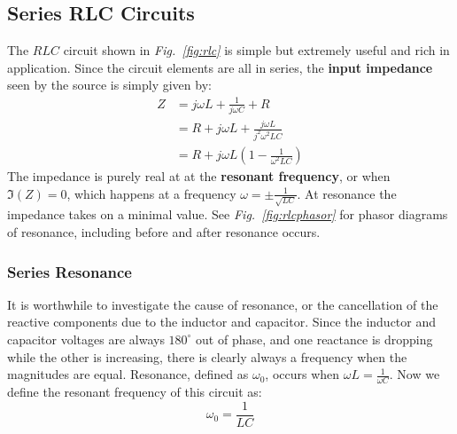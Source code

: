 \subsection{Series RLC Circuits} \label{sec:lcr}
The $RLC$ circuit shown in \emph{Fig.~\ref{fig:rlc}} is simple but extremely useful and rich in application.  Since the circuit elements are all in series, the \textbf{input impedance} seen by the source is simply given by:
    \begin{align*}
        Z &= j\omega L + \frac{1}{j\omega C} + R\\
        &= R + j\omega L + \frac{j\omega L}{j^2{\omega}^2 LC}\\
        &= R + j\omega L \left( 1 - \frac{1}{\omega^2 LC}\right)
    \end{align*}
The impedance is purely real at at the \textbf{resonant frequency}, or when $\Im(Z) = 0$, which happens at a frequency $\omega = \pm \frac{1}{\sqrt{L C}}$.  At resonance the impedance takes on a minimal value.  See \emph{Fig.~\ref{fig:rlcphasor}} for phasor diagrams of resonance, including before and after resonance occurs.
\subsubsection{Series Resonance}
It is worthwhile to investigate the cause of resonance, or the cancellation of the reactive components due to the inductor and capacitor.  Since the inductor and capacitor voltages are always $180^\circ$ out of phase, and one reactance is dropping while the other is increasing, there is clearly always a frequency when the magnitudes are equal.  Resonance, defined as $\omega_0$, occurs when $\omega L = \frac{1}{\omega C}$.  Now we define the resonant frequency of this circuit as:
    \begin{equation}
        \omega_0 = \frac{1}{LC}
    \end{equation}
